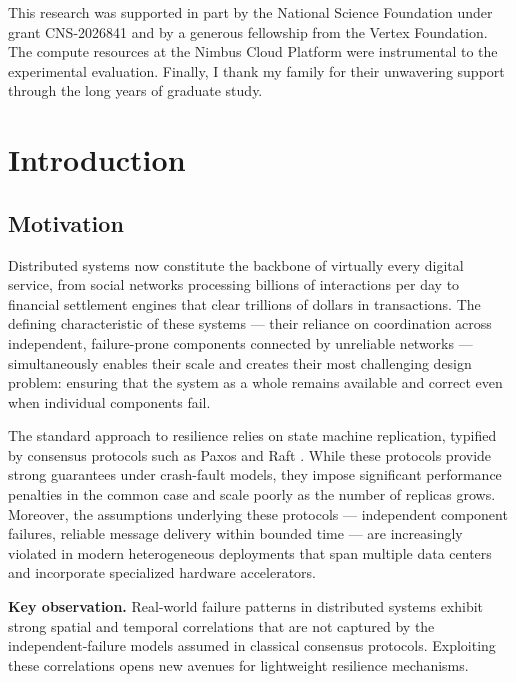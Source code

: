 \documentclass[12pt,letterpaper,oneside]{report}
\begin{document}
This research was supported in part by the National Science Foundation under grant CNS-2026841 and by a generous fellowship from the Vertex Foundation. The compute resources at the Nimbus Cloud Platform were instrumental to the experimental evaluation. Finally, I thank my family for their unwavering support through the long years of graduate study.

\tableofcontents
\clearpage


\chapter{Introduction}

\section{Motivation}

Distributed systems now constitute the backbone of virtually every digital service, from social networks processing billions of interactions per day to financial settlement engines that clear trillions of dollars in transactions. The defining characteristic of these systems --- their reliance on coordination across independent, failure-prone components connected by unreliable networks --- simultaneously enables their scale and creates their most challenging design problem: ensuring that the system as a whole remains available and correct even when individual components fail.

The standard approach to resilience relies on state machine replication, typified by consensus protocols such as Paxos \cite{lamport2001} and Raft \cite{ongaro2014}. While these protocols provide strong guarantees under crash-fault models, they impose significant performance penalties in the common case and scale poorly as the number of replicas grows. Moreover, the assumptions underlying these protocols --- independent component failures, reliable message delivery within bounded time --- are increasingly violated in modern heterogeneous deployments that span multiple data centers and incorporate specialized hardware accelerators.

\begin{notebox}
\textbf{Key observation.} Real-world failure patterns in distributed systems exhibit strong spatial and temporal correlations that are not captured by the independent-failure models assumed in classical consensus protocols. Exploiting these correlations opens new avenues for lightweight resilience mechanisms.
\end{notebox}
\end{document}
